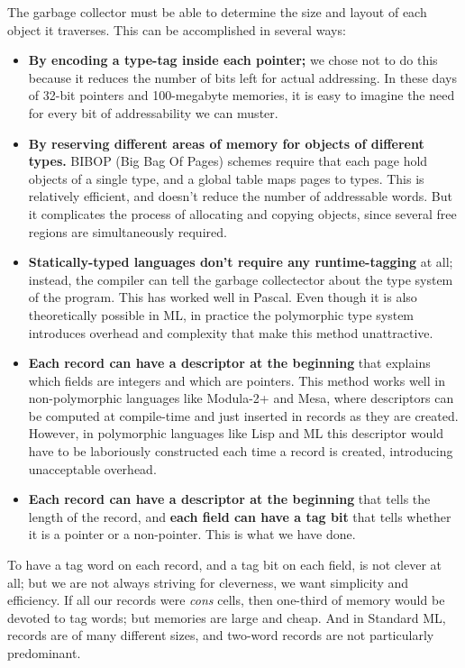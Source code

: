 The garbage collector must be able to determine the size and layout of each
object it traverses.  This can be accomplished in several ways:
\begin{itemize}
\item {\bf  By encoding a type-tag
inside each pointer;} we chose not to do this
because it reduces the number of bits left for actual addressing.
In these days of 32-bit pointers and 100-megabyte memories, it is easy
to imagine the need for every bit of addressability we can muster.
\item {\bf By reserving different areas of memory for objects of different
types.}
BIBOP (Big Bag Of Pages) schemes require that each page hold objects of a single
type, and a global table maps pages to types.  This is relatively efficient,
and doesn't reduce the number of addressable words.  But it complicates the
process of allocating and copying objects, since several free regions
are simultaneously required.  
\item {\bf Statically-typed languages don't require any runtime-tagging} at all;
instead, the compiler can tell the garbage collectector about the type
system of the program.  This has worked well in Pascal\cite{britton75}.
Even though it is also theoretically possible in ML, in practice the
polymorphic type system introduces overhead and complexity that make
this method unattractive\cite{appel89:tag}.
\item {\bf Each record can have a descriptor at the beginning} that explains
which fields are integers and which are pointers.  This method works
well in non-polymorphic languages like Modula-2+ and Mesa, where
descriptors can be computed at compile-time and just inserted
in records as they are created.  However,
in polymorphic languages like Lisp and ML
this descriptor would have to be laboriously
constructed each time a record is created, introducing unacceptable overhead.
\item {\bf Each record can have a descriptor at the
beginning} that tells
the length of the record, and {\bf each field can have a tag bit} that tells
whether it is a pointer or a non-pointer.
This is what we have done.
\end{itemize}

To have a tag word on each record, and a tag bit on each
field, is not clever at all; but we are not always
striving for cleverness, we 
want simplicity and efficiency.  If all our records were {\em cons} cells,
then one-third of memory would be devoted to tag words; but memories
are large and cheap.  And in Standard ML, records are of many different
sizes, and two-word records are not particularly predominant.


